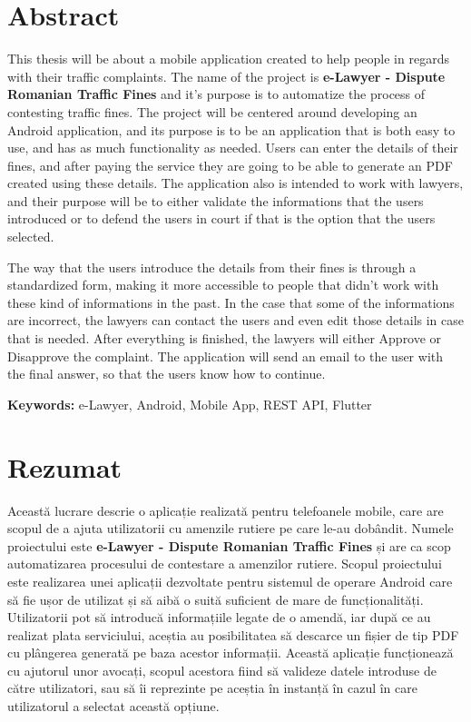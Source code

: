 \documentclass[12pt,a4paper]{report}
\theoremstyle{definition}
\theoremstyle{remark}
\begin{document}
\chapter*{Abstract}
This thesis will be about a mobile application created to help people in regards with their traffic complaints. The name of the project is \textbf{e-Lawyer - Dispute Romanian Traffic Fines} and it's purpose is to automatize the process of contesting traffic fines. The project will be centered around developing an Android application, and its purpose is to be an application that is both easy to use, and has as much functionality as needed. Users can enter the details of their fines, and after paying the service they are going to be able to generate an PDF created using these details. The application also is intended to work with lawyers, and their purpose will be to either validate the informations that the users introduced or to defend the users in court if that is the option that the users selected.

The way that the users introduce the details from their fines is through a standardized form, making it more accessible to people that didn't work with these kind of informations in the past. In the case that some of the informations are incorrect, the lawyers can contact the users and even edit those details in case that is needed. After everything is finished, the lawyers will either Approve or Disapprove the complaint. The application will send an email to the user with the final answer, so that the users know how to continue.

\textbf{Keywords:} e-Lawyer, Android, Mobile App, REST API, Flutter

\newpage

\chapter*{Rezumat}
Această lucrare descrie o aplicație realizată pentru telefoanele mobile, care are scopul de a ajuta utilizatorii cu amenzile rutiere pe care le-au dobândit. Numele proiectului este \textbf{e-Lawyer - Dispute Romanian Traffic Fines} și are ca scop automatizarea procesului de contestare a amenzilor rutiere. Scopul proiectului este realizarea unei aplicații dezvoltate pentru sistemul de operare Android care să fie ușor de utilizat și să aibă o suită suficient de mare de funcționalități. Utilizatorii pot să introducă informațiile legate de o amendă, iar după ce au realizat plata serviciului, aceștia au posibilitatea să descarce un fișier de tip PDF cu plângerea generată pe baza acestor informații. Această aplicație funcționează cu ajutorul unor avocați, scopul acestora fiind să valideze datele introduse de către utilizatori, sau să îi reprezinte pe aceștia în instanță în cazul în care utilizatorul a selectat această opțiune.
\end{document}
